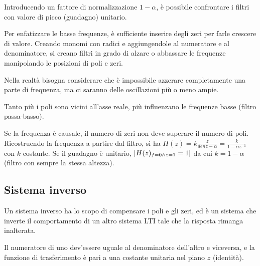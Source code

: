 Introducendo un fattore di normalizzazione $1 - \alpha$, è possibile confrontare i filtri con valore di picco (guadagno) unitario.

Per enfatizzare le basse frequenze, è sufficiente inserire degli zeri per farle crescere di valore. Creando monomi con radici e aggiungendole al numeratore e al denominatore, si creano filtri in grado di alzare o abbassare le frequenze manipolando le posizioni di poli e zeri.

Nella realtà bisogna considerare che è impossibile azzerare completamente una parte di frequenza, ma ci saranno delle oscillazioni più o meno ampie.

Tanto più i poli sono vicini all'asse reale, più influenzano le frequenze basse (filtro passa-basso).

Se la frequenza è causale, il numero di zeri non deve superare il numero di poli.
Ricostruendo la frequenza a partire dal filtro, si ha $H(z) = k \frac{z}{denz - \alpha} = \frac{k}{1 - \alpha z^{-1}}$ con $k$ costante. Se il guadagno è unitario, $\left|H(z)_{f=0 \land z=1} = 1\right|$ da cui $k = 1 - \alpha$ (filtro con sempre la stessa altezza).

\subsection{Sistema inverso}
Un sistema inverso ha lo scopo di compensare i poli e gli zeri, ed è un sistema che inverte il comportamento di un altro sistema LTI tale che la risposta rimanga inalterata.

Il numeratore di uno dev'essere uguale al denominatore dell'altro e viceversa, e la funzione di trasferimento è pari a una costante unitaria nel piano $z$ (identità).



